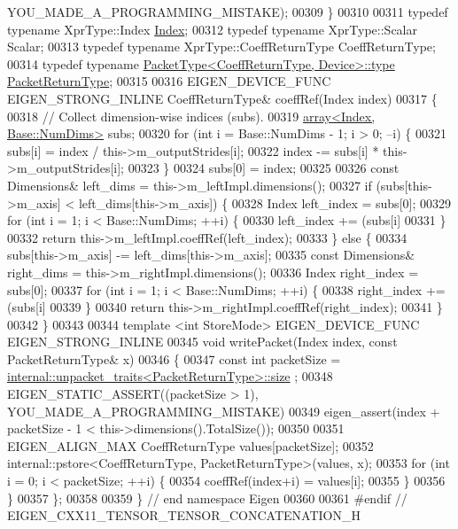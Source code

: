 \begin{DoxyCode}
      YOU\_MADE\_A\_PROGRAMMING\_MISTAKE);
00309   \}
00310 
00311   \textcolor{keyword}{typedef} \textcolor{keyword}{typename} XprType::Index \hyperlink{namespace_eigen_a62e77e0933482dafde8fe197d9a2cfde}{Index};
00312   \textcolor{keyword}{typedef} \textcolor{keyword}{typename} XprType::Scalar Scalar;
00313   \textcolor{keyword}{typedef} \textcolor{keyword}{typename} XprType::CoeffReturnType CoeffReturnType;
00314   \textcolor{keyword}{typedef} \textcolor{keyword}{typename} \hyperlink{group___sparse_core___module}{PacketType<CoeffReturnType, Device>::type} 
      \hyperlink{group___sparse_core___module}{PacketReturnType};
00315 
00316   EIGEN\_DEVICE\_FUNC EIGEN\_STRONG\_INLINE CoeffReturnType& coeffRef(Index index)
00317   \{
00318     \textcolor{comment}{// Collect dimension-wise indices (subs).}
00319     \hyperlink{class_eigen_1_1array}{array<Index, Base::NumDims>} subs;
00320     \textcolor{keywordflow}{for} (\textcolor{keywordtype}{int} i = Base::NumDims - 1; i > 0; --i) \{
00321       subs[i] = index / this->m\_outputStrides[i];
00322       index -= subs[i] * this->m\_outputStrides[i];
00323     \}
00324     subs[0] = index;
00325 
00326     \textcolor{keyword}{const} Dimensions& left\_dims = this->m\_leftImpl.dimensions();
00327     \textcolor{keywordflow}{if} (subs[this->m\_axis] < left\_dims[this->m\_axis]) \{
00328       Index left\_index = subs[0];
00329       \textcolor{keywordflow}{for} (\textcolor{keywordtype}{int} i = 1; i < Base::NumDims; ++i) \{
00330         left\_index += (subs[i] %
00331       \}
00332       \textcolor{keywordflow}{return} this->m\_leftImpl.coeffRef(left\_index);
00333     \} \textcolor{keywordflow}{else} \{
00334       subs[this->m\_axis] -= left\_dims[this->m\_axis];
00335       \textcolor{keyword}{const} Dimensions& right\_dims = this->m\_rightImpl.dimensions();
00336       Index right\_index = subs[0];
00337       \textcolor{keywordflow}{for} (\textcolor{keywordtype}{int} i = 1; i < Base::NumDims; ++i) \{
00338         right\_index += (subs[i] %
00339       \}
00340       \textcolor{keywordflow}{return} this->m\_rightImpl.coeffRef(right\_index);
00341     \}
00342   \}
00343 
00344   \textcolor{keyword}{template} <\textcolor{keywordtype}{int} StoreMode> EIGEN\_DEVICE\_FUNC EIGEN\_STRONG\_INLINE
00345   \textcolor{keywordtype}{void} writePacket(Index index, \textcolor{keyword}{const} PacketReturnType& x)
00346   \{
00347     \textcolor{keyword}{const} \textcolor{keywordtype}{int} packetSize = \hyperlink{struct_eigen_1_1internal_1_1unpacket__traits}{internal::unpacket\_traits<PacketReturnType>::size}
      ;
00348     EIGEN\_STATIC\_ASSERT((packetSize > 1), YOU\_MADE\_A\_PROGRAMMING\_MISTAKE)
00349     eigen\_assert(index + packetSize - 1 < this->dimensions().TotalSize());
00350 
00351     EIGEN\_ALIGN\_MAX CoeffReturnType values[packetSize];
00352     internal::pstore<CoeffReturnType, PacketReturnType>(values, x);
00353     \textcolor{keywordflow}{for} (\textcolor{keywordtype}{int} i = 0; i < packetSize; ++i) \{
00354       coeffRef(index+i) = values[i];
00355     \}
00356   \}
00357 \};
00358 
00359 \} \textcolor{comment}{// end namespace Eigen}
00360 
00361 \textcolor{preprocessor}{#endif // EIGEN\_CXX11\_TENSOR\_TENSOR\_CONCATENATION\_H}
\end{DoxyCode}

